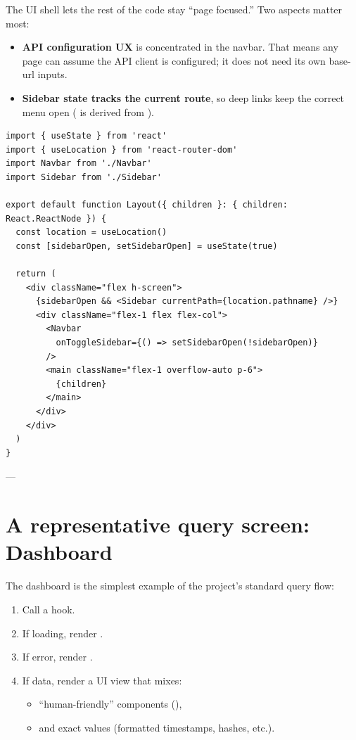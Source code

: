The UI shell lets the rest of the code stay ``page focused.'' Two aspects matter most:

\begin{itemize}
  \item \textbf{API configuration UX} is concentrated in the navbar. That means any page can assume the API client is configured; it does not need its own base-url inputs.
  \item \textbf{Sidebar state tracks the current route}, so deep links keep the correct menu open ( is derived from ).
\end{itemize}

\begin{listing}[htbp]
\caption{Layout component with navbar and sidebar}
\label{lst:ch21-layout}
\begin{verbatim}
import { useState } from 'react'
import { useLocation } from 'react-router-dom'
import Navbar from './Navbar'
import Sidebar from './Sidebar'

export default function Layout({ children }: { children: React.ReactNode }) {
  const location = useLocation()
  const [sidebarOpen, setSidebarOpen] = useState(true)

  return (
    <div className="flex h-screen">
      {sidebarOpen && <Sidebar currentPath={location.pathname} />}
      <div className="flex-1 flex flex-col">
        <Navbar
          onToggleSidebar={() => setSidebarOpen(!sidebarOpen)}
        />
        <main className="flex-1 overflow-auto p-6">
          {children}
        </main>
      </div>
    </div>
  )
}
\end{verbatim}
\end{listing}

---

\section{A representative query screen: Dashboard}
\label{sec:dashboard-screen}

The dashboard is the simplest example of the project's standard query flow:

\begin{enumerate}
  \item Call a hook.
  \item If loading, render .
  \item If error, render .
  \item If data, render a UI view that mixes:
    \begin{itemize}
      \item ``human-friendly'' components (),
      \item and exact values (formatted timestamps, hashes, etc.).
    \end{itemize}
\end{enumerate}

